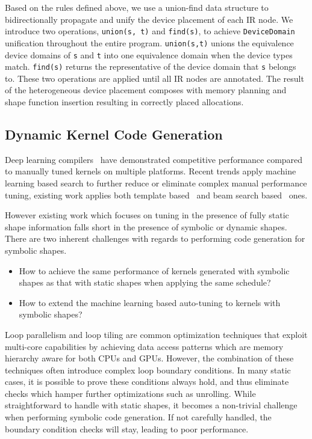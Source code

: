 Based on the rules defined above, we use a union-find data structure to bidirectionally
  propagate and unify the device placement of each IR node.
We introduce two operations, \texttt{union(s, t)} and \texttt{find(s)},
  to achieve \texttt{DeviceDomain} unification throughout the entire program.
\texttt{union(s,t)} unions the equivalence device domains of \texttt{s} and \texttt{t}
  into one equivalence domain when the device types match.
\texttt{find(s)} returns the representative of the device domain
  that \texttt{s} belongs to.
These two operations are applied until all IR nodes are annotated.
The result of the heterogeneous device placement composes with memory planning
  and shape function insertion resulting in correctly placed allocations.

\subsection{Dynamic Kernel Code Generation}
\label{sec:compliation:codegen}

Deep learning compilers~\citep{tvm_osdi18, halide} have demonstrated competitive performance
  compared to manually tuned kernels on multiple platforms.
Recent trends apply machine learning based search to further reduce
  or eliminate complex manual performance tuning,
  existing work applies both template based~\citep{chen2018learning, zheng2020flextensor}
  and beam search based~\citep{adams2019learning} ones.

However existing work which focuses on tuning in the presence of fully
  static shape information falls short in the presence of symbolic or dynamic shapes.
There are two inherent challenges with regards to performing code generation for symbolic shapes.
\begin{itemize}
    \item How to achieve the same performance of kernels generated with symbolic shapes as
          that with static shapes when applying the same schedule?
    \item How to extend the machine learning based auto-tuning to kernels with symbolic shapes?
\end{itemize}

Loop parallelism and loop tiling are common optimization techniques that exploit multi-core capabilities
  by achieving data access patterns which are memory hierarchy aware for both CPUs and GPUs.
However, the combination of these techniques often introduce complex loop boundary conditions.
In many static cases, it is possible to prove these conditions always hold,
  and thus eliminate checks which hamper further optimizations such as unrolling.
While straightforward to handle with static shapes, it becomes a non-trivial challenge
  when performing symbolic code generation.
If not carefully handled, the boundary condition checks will stay, leading to poor performance.

